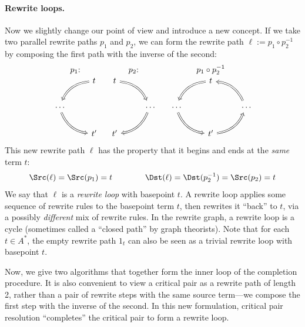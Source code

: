 \documentclass[../generics]{subfiles}
\begin{document}
\paragraph{Rewrite loops.}
Now we slightly change our point of view and introduce a new concept. If we take two parallel rewrite paths $p_1$ and $p_2$, we can form the rewrite path $\ell:=p_1\circ p_2^{-1}$ by composing the first path with the inverse of the second:
\[
\begin{array}{ccc}
\text{$p_1$:}&\text{$p_2$:}&\text{$p_1\circ p_2^{-1}$}\\
\begin{tikzcd}
&t\arrow[ld, Rightarrow, bend right]\\
\vphantom{P}\cdots\arrow[rd, Rightarrow, bend right]\\
&t^\prime
\end{tikzcd}&
\begin{tikzcd}
t\arrow[rd, Rightarrow, bend left]\\
&\vphantom{P}\cdots\arrow[ld, Rightarrow, bend left]\\
t^\prime
\end{tikzcd}&
\begin{tikzcd}
&t\arrow[ld, Rightarrow, bend right]\\
\vphantom{P}\cdots\arrow[rd, Rightarrow, bend right]&&\vphantom{P}\cdots\arrow[lu, Rightarrow, bend right]\\
&t^\prime\arrow[ru, Rightarrow, bend right]
\end{tikzcd}
\end{array}
\]
This new rewrite path $\ell$ has the property that it begins and ends at the \emph{same} term $t$:
\begin{gather*}
\Src(\ell)=\Src(p_1)=t\qquad\qquad\Dst(\ell)=\Dst(p_2^{-1})=\Src(p_2)=t
\end{gather*}
We say that $\ell$ is a \emph{rewrite loop} with basepoint $t$. A rewrite loop applies some sequence of rewrite rules to the basepoint term $t$, then rewrites it ``back'' to $t$, via a possibly \emph{different} mix of rewrite rules. In the rewrite graph, a rewrite loop is a cycle (sometimes called a ``closed path'' by graph theorists). Note that for each $t\in A^*$, the empty rewrite path $1_t$ can also be seen as a trivial rewrite loop with basepoint $t$.

Now, we give two algorithms that together form the inner loop of the completion procedure. It is also convenient to view a critical pair as a rewrite path of length 2, rather than a pair of rewrite steps with the same source term---we compose the first step with the inverse of the second. In this new formulation, critical pair resolution ``completes'' the critical pair to form a rewrite loop.
\end{document}

